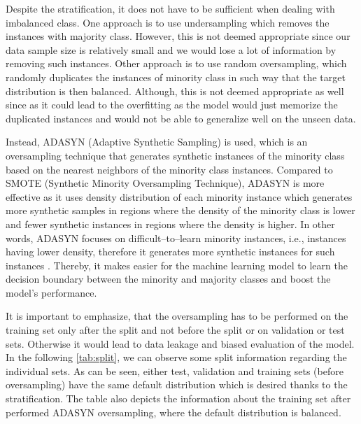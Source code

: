 Despite the stratification, it does not have to be sufficient when dealing with imbalanced class.
One approach is to use undersampling which removes the instances with majority class.
However, this is not deemed appropriate since our data sample size is relatively small and we would lose a lot of information by removing such instances.
Other approach is to use random oversampling, which randomly duplicates the instances of minority class in such way that the target distribution is then balanced.
Although, this is not deemed appropriate as well since as it could lead to the overfitting as the model would just memorize the duplicated instances and would not be able to generalize well on the unseen data.

Instead, ADASYN (Adaptive Synthetic Sampling) is used, which is an oversampling technique that generates synthetic instances of the minority class based on the nearest neighbors of the minority class instances.
Compared to SMOTE (Synthetic Minority Oversampling Technique), ADASYN is more effective as it uses density distribution of each minority instance which generates more synthetic samples in regions where the density of the minority class is lower and fewer synthetic instances in regions where the density is higher.
In other words, ADASYN focuses on difficult--to--learn minority instances, i.e., instances having lower density, therefore it generates more synthetic instances for such instances \citep{adasynhaibo}. Thereby, it makes easier for the machine learning model to learn the decision boundary between the minority and majority classes and boost the model's performance. 

It is important to emphasize, that the oversampling has to be performed on the training set only after the split and not before the split or on validation or test sets. Otherwise it would lead to data leakage and biased evaluation of the model.
In the following \autoref{tab:split}, we can observe some split information regarding the individual sets. As can be seen,  either test, validation and training sets (before oversampling) have the same default distribution which is desired thanks to the stratification. The table also depicts the information about the training set after performed ADASYN oversampling, where the default distribution is balanced. 


